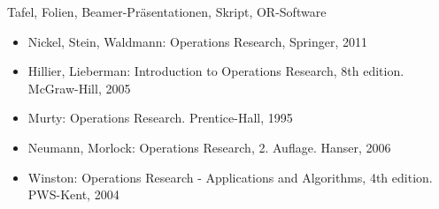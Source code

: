 \begin{course}
\begin{content}
\end{content}

\begin{media}Tafel, Folien, Beamer-Präsentationen, Skript, OR-Software

\end{media}

\begin{literature}\begin{itemize}\item Nickel, Stein, Waldmann: Operations Research, Springer, 2011  \item Hillier, Lieberman: Introduction to Operations Research, 8th edition. McGraw-Hill, 2005  \item Murty: Operations Research. Prentice-Hall, 1995  \item Neumann, Morlock: Operations Research, 2. Auflage. Hanser, 2006  \item Winston: Operations Research - Applications and Algorithms, 4th edition. PWS-Kent, 2004  \end{itemize}\end{literature}



\end{course}